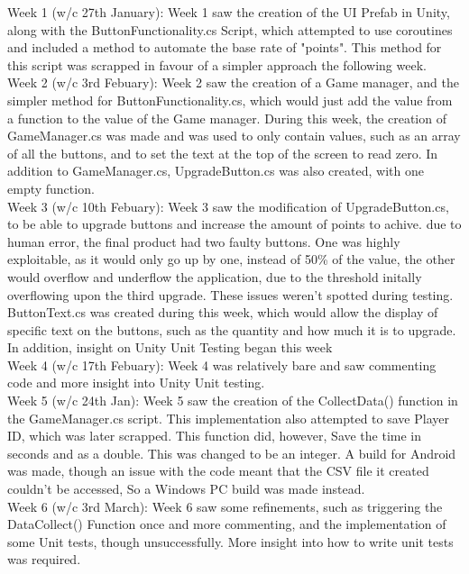 \documentclass[conference]{IEEEtran}
\begin{document}
Week 1 (w/c 27th January): 
Week 1 saw the creation of the UI Prefab in Unity, along with the ButtonFunctionality.cs Script, which attempted to use coroutines and included a method to automate the base rate of "points". This method for this script was scrapped in favour of a simpler approach the following week.\\

Week 2 (w/c 3rd Febuary):
Week 2 saw the creation of a Game manager, and the simpler method for ButtonFunctionality.cs, which would just add the value from a function to the value of the Game manager. During this week, the creation of GameManager.cs was made and was used to only contain values, such as an array of all the buttons, and to set the text at the top of the screen to read zero. In addition to GameManager.cs, UpgradeButton.cs was also created, with one empty function.\\

Week 3 (w/c 10th Febuary):
Week 3 saw the modification of UpgradeButton.cs, to be able to upgrade buttons and increase the amount of points to achive. due to human error, the final product had two faulty buttons. One was highly exploitable, as it would only go up by one, instead of 50\% of the value, the other would overflow and underflow the application, due to the threshold initally overflowing upon the third upgrade. These issues weren't spotted during testing. ButtonText.cs was created during this week, which would allow the display of specific text on the buttons, such as the quantity and how much it is to upgrade. In addition, insight on Unity Unit Testing began this week\\

Week 4 (w/c 17th Febuary):
Week 4  was relatively bare and saw commenting code and more insight into Unity Unit testing.\\

Week 5 (w/c 24th Jan):
Week 5 saw the creation of the CollectData() function in the GameManager.cs script. This implementation also attempted to save Player ID, which was later scrapped. This function did, however, Save the time in seconds and as a double. This was changed to be an integer. A build for Android was made, though an issue with the code meant that the CSV file it created couldn't be accessed, So a Windows PC build was made instead.\\

Week 6 (w/c 3rd March):
Week 6 saw some refinements, such as triggering the DataCollect() Function once and more commenting, and the implementation of some Unit tests, though unsuccessfully. More insight into how to write unit tests was required.\\
\end{document}
